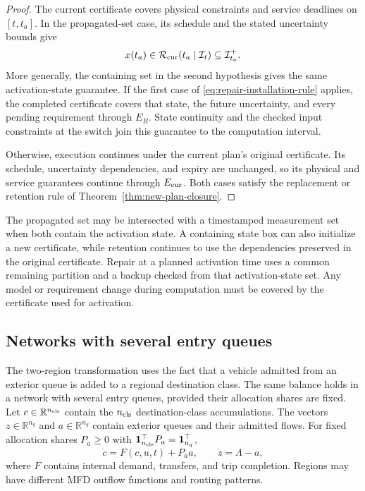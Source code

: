 \documentclass[preprint,12pt]{elsarticle}
\theoremstyle{definition}
\theoremstyle{plain}
\theoremstyle{definition}
\theoremstyle{plain}
\newcommand{\R}{\mathbb{R}}
\begin{document}
\begin{proof}
The current certificate covers physical constraints and service deadlines
on $[t,t_a]$. In the propagated-set case, its schedule and the stated
uncertainty bounds give
\[
x(t_a)\in\mathcal R_{\rm cur}(t_a\mid\mathcal I_t)
       \subseteq\mathcal I_{t_a}^+.
\]
More generally, the containing set in the second hypothesis gives the
same activation-state guarantee. If the first case of
\eqref{eq:repair-installation-rule} applies, the completed certificate
covers that state, the future uncertainty, and every pending requirement
through $E_R$. State continuity and the checked input constraints at the
switch join this guarantee to the computation interval.

Otherwise, execution continues under the current plan's original
certificate. Its schedule, uncertainty dependencies, and expiry are
unchanged, so its physical and service guarantees continue through
$E_{\rm cur}$. Both cases satisfy the replacement or retention rule of
Theorem~\ref{thm:new-plan-closure}.
\end{proof}

The propagated set may be intersected with a timestamped measurement set
when both contain the activation state. A containing state box can also
initialize a new certificate, while retention continues to use the
dependencies preserved in the original certificate. Repair at a planned
activation time uses a common remaining partition and a backup checked
from that activation-state set. Any model or requirement change during
computation must be covered by the certificate used for activation.

\subsection{Networks with several entry queues}
\label{sec:network-extension}

The two-region transformation uses the fact that a vehicle admitted from
an exterior queue is added to a regional destination class. The same
balance holds in a network with several entry queues, provided their
allocation shares are fixed. Let $c\in\R^{n_{\rm cls}}$ contain the
$n_{\rm cls}$ destination-class accumulations. The vectors
$z\in\R^{n_q}$ and $a\in\R^{n_q}$ contain exterior queues and their
admitted flows. For fixed allocation shares
$P_a\ge0$ with $\mathbf1_{n_{\rm cls}}^\top P_a=\mathbf1_{n_q}^\top$,
\begin{equation}
 \dot c=F(c,u,t)+P_a a,\qquad \dot z=\Lambda-a,
 \label{eq:network-class-queue}
\end{equation}
where $F$ contains internal demand, transfers, and trip completion. Regions
may have different MFD outflow functions and routing patterns.
\end{document}
